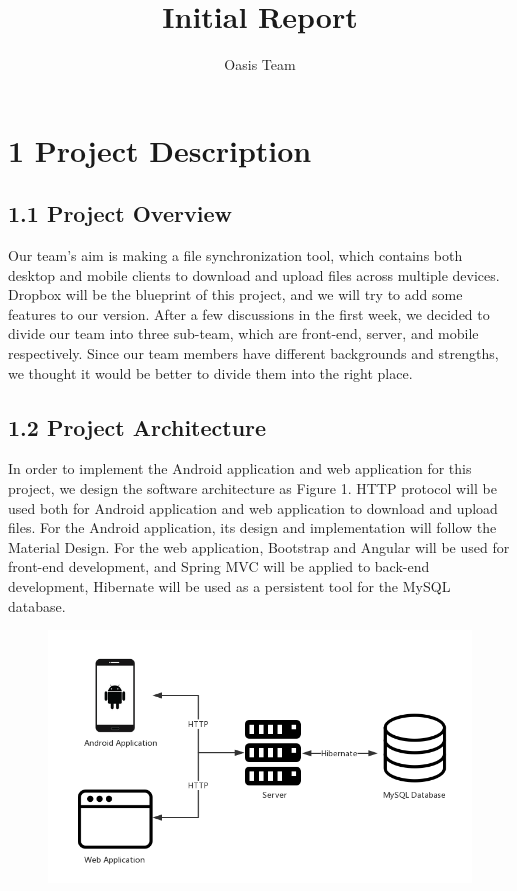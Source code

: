 \documentclass[a4paper]{report}
\begin{document}
\title{Initial Report}
\author{Oasis Team}

\maketitle



\section*{1 Project Description }
\subsection* {1.1 Project Overview}
Our team’s aim is making a file synchronization tool, which contains both desktop and mobile clients to download and upload files across multiple devices. Dropbox will be the blueprint of this project, and we will try to add some features to our version. After a few discussions in the first week, we decided to divide our team into three sub-team, which are front-end, server, and mobile respectively.  Since our team members have different backgrounds and strengths, we thought it would be better to divide them into the right place.  

\subsection* {1.2 Project Architecture}
In order to implement the Android application and web application for this project, we design the software architecture as Figure 1. HTTP protocol will be used both for Android application and web application to download and upload files. For the Android application, its design and implementation will follow the Material Design. For the web application, Bootstrap and Angular will be used for front-end development, and Spring MVC will be applied to back-end development, Hibernate will be used as a persistent tool for the MySQL database.



\begin{figure}[h]
\centering
\includegraphics[width=4.6in]{figure1}
\end{figure}
\end{document}
